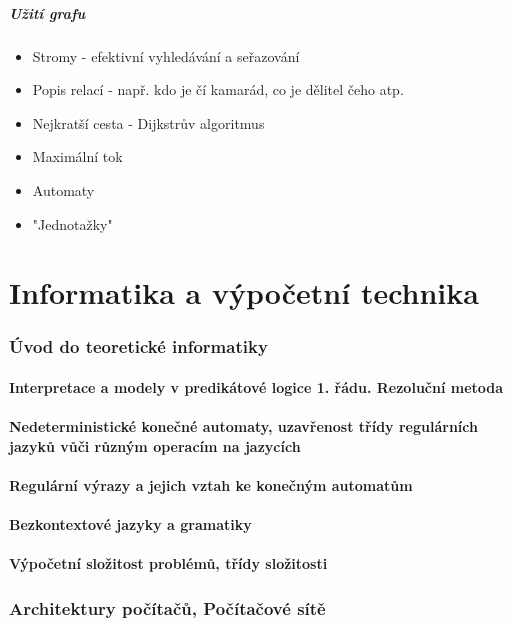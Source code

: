 \documentclass[10pt,a4paper]{article}
\begin{document}
\subsubsection{Užití grafu}
\begin{itemize}
\item Stromy - efektivní vyhledávání a seřazování
\item Popis relací - např. kdo je čí kamarád, co je dělitel čeho atp.
\item Nejkratší cesta - Dijkstrův algoritmus
\item Maximální tok
\item Automaty
\item "Jednotažky"
\end{itemize}
\newpage
\part{Informatika a výpočetní technika}
\newpage
\section{Úvod do teoretické informatiky}
\subsection{Interpretace a modely v predikátové logice 1. řádu. Rezoluční metoda}
\subsection{Nedeterministické konečné automaty, uzavřenost třídy regulárních jazyků vůči různým operacím na jazycích}
\subsection{Regulární výrazy a jejich vztah ke konečným automatům}
\subsection{Bezkontextové jazyky a gramatiky}
\subsection{Výpočetní složitost problémů, třídy složitosti}


\newpage
\section{Architektury počítačů, Počítačové sítě}
\end{document}

